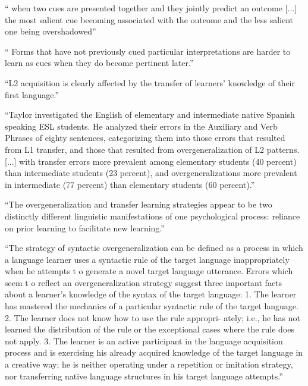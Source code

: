 `` when two cues are presented together and they
jointly predict an outcome [...] the most salient cue becoming associated with the
outcome and the less salient one being overshadowed''

`` Forms that have not
previously cued particular interpretations are harder to learn as cues when
they do become pertinent later.''

``L2 acquisition is clearly affected by the transfer
of learners’ knowledge of their first language.''





``Taylor investigated
the English of elementary and intermediate native Spanish speaking ESL
students. He analyzed their errors in the Auxiliary and Verb Phrases of eighty
sentences, categorizing them into those errors that resulted from L1 transfer,
and those that resulted from overgeneralization of L2 patterns.
[...] with transfer
errors more prevalent among elementary students (40 percent) than
intermediate students (23 percent), and overgeneralizations more prevalent
in intermediate (77 percent) than elementary students (60 percent).''

\cite{Taylor75}
``The overgeneralization and transfer learning strategies
appear to be two distinctly different linguistic manifestations of
one psychological process: reliance on prior learning to facilitate
new learning.''

``The strategy of syntactic overgeneralization can be defined as
a process in which a language learner uses a syntactic rule of the
target language inappropriately when he attempts t o generate a
novel target language utterance. Errors which seem t o reflect an
overgeneralization strategy suggest three important facts about a
learner’s knowledge of the syntax of the target language:
1. The learner has mastered the mechanics of a particular
syntactic rule of the target language.
2. The learner does not know how to use the rule appropri-
ately; i.e., he has not learned the distribution of the rule or the
exceptional cases where the rule does not apply.
3. The learner is an active participant in the language
acquisition process and is exercising his already acquired knowledge
of the target language in a creative way; he is neither operating
under a repetition or imitation strategy, nor transferring native
language structures in his target language attempts.''

